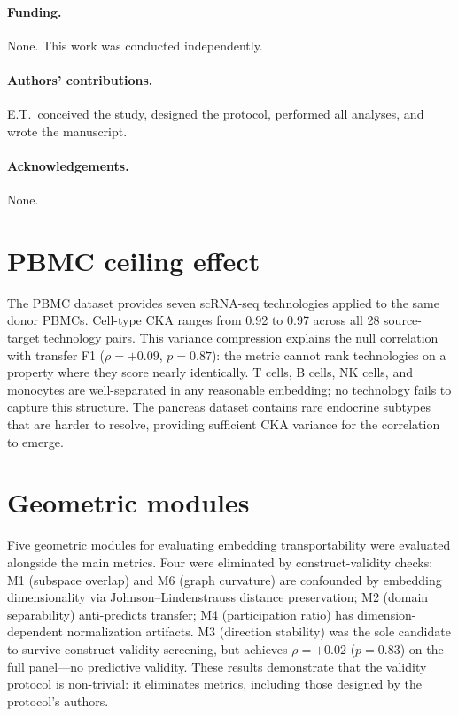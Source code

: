\documentclass[11pt]{article}
\begin{document}
\paragraph{Funding.} None. This work was conducted independently.

\paragraph{Authors' contributions.} E.T.\ conceived the study,
designed the protocol, performed all analyses, and wrote the
manuscript.

\paragraph{Acknowledgements.} None.


\appendix

\section{PBMC ceiling effect}
\label{app:pbmc}

The PBMC dataset \citep{ding2020systematic} provides seven scRNA-seq
technologies applied to the same donor PBMCs. Cell-type CKA ranges from
0.92 to 0.97 across all 28 source-target technology pairs. This
variance compression explains the null correlation with transfer F1
($\rho = +0.09$, $p = 0.87$): the metric cannot rank technologies on
a property where they score nearly identically. T cells, B cells, NK
cells, and monocytes are well-separated in any reasonable embedding; no
technology fails to capture this structure. The pancreas dataset contains
rare endocrine subtypes that are harder to resolve, providing sufficient
CKA variance for the correlation to emerge.


\section{Geometric modules}
\label{app:modules}

Five geometric modules for evaluating embedding transportability were
evaluated alongside the main metrics. Four were
eliminated by construct-validity checks: M1 (subspace overlap) and M6
(graph curvature) are confounded by embedding dimensionality via
Johnson--Lindenstrauss distance preservation; M2 (domain separability)
anti-predicts transfer; M4 (participation ratio) has
dimension-dependent normalization artifacts. M3 (direction stability)
was the sole candidate to survive construct-validity screening, but
achieves $\rho = +0.02$ ($p = 0.83$) on the full panel---no
predictive validity. These results demonstrate that the validity
protocol is non-trivial: it eliminates metrics, including those designed
by the protocol's authors.
\end{document}
